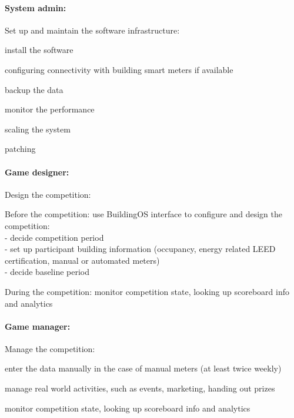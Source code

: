 \paragraph{System admin:} Set up and maintain the software infrastructure:
    \begin{compactitem}
    \item install the software
    \item configuring connectivity with building smart meters if available
    \item backup the data
    \item monitor the performance
    \item scaling the system
    \item patching
    \end{compactitem}
        
\paragraph{Game designer:} Design the competition:
    \begin{compactitem}
    \item Before the competition: use BuildingOS interface to configure and design the competition:\\
        - decide competition period\\
        - set up participant building information (occupancy, energy related LEED certification, manual or automated meters)\\
        - decide baseline period
    
    \item During the competition: monitor competition state, looking up scoreboard info and analytics
    \end{compactitem}

\paragraph{Game manager:} Manage the competition: 
    \begin{compactitem}
    \item enter the data manually in the case of manual meters (at least twice weekly)
    \item manage real world activities, such as events, marketing, handing out prizes
    \item monitor competition state, looking up scoreboard info and analytics
    \end{compactitem}
    
